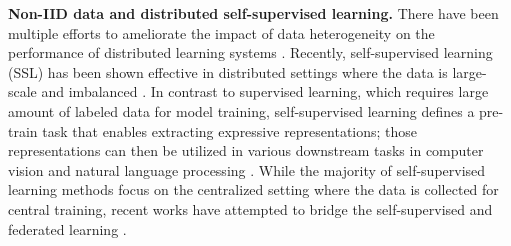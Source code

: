 {\bf Non-IID data and distributed self-supervised learning.} There have been multiple efforts to ameliorate the impact of data heterogeneity on the performance of distributed learning systems \cite{karimireddy2020scaffold, ghosh2020efficient, li2022federated}. Recently, self-supervised learning (SSL) has been shown effective in distributed settings where the data is large-scale and imbalanced \cite{wang2022does}. In contrast to supervised learning, which requires large amount of labeled data for model training, self-supervised learning defines a pre-train task that enables extracting expressive representations; those representations can then be utilized in various downstream tasks in computer vision and natural language processing \cite{chen2020simple,chen2021exploring}. While the majority of self-supervised learning methods focus on the centralized setting where the data is collected for central training, recent works have attempted to bridge the self-supervised and federated learning \cite{he2021ssfl, zhuang2022divergence, makhija2022federated}.  